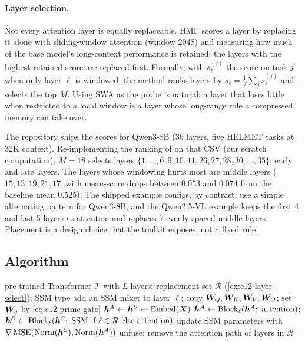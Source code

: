 \paragraph{Layer selection.} Not every attention layer is equally replaceable. HMF scores a layer by
replacing it alone with sliding-window attention (window 2048) and measuring how much of the base
model's long-context performance is retained; the layers with the highest retained score are
replaced first. Formally, with $s_\ell^{(j)}$ the score on task $j$ when only layer $\ell$ is
windowed, the method ranks layers by $\bar s_\ell = \frac1J\sum_js^{(j)}_\ell$ and selects the top
$M$. Using SWA as the probe is natural: a layer that loses little when restricted to a local window
is a layer whose long-range role a compressed memory can take over.

\begin{example}\label{ex:c12-layer-select}
The repository ships the scores for Qwen3-8B (36 layers, five HELMET tasks at 32K context). Re-implementing
the ranking of  on that CSV (our scratch computation), $M = 18$ selects
layers $\{1,\dots,6, 9, 10, 11, 26, 27, 28, 30,\dots,35\}$: early and late layers. The layers whose
windowing hurts most are middle layers ($15, 13, 19, 21, 17$, with mean-score drops between $0.053$
and $0.074$ from the baseline mean $0.525$). The shipped example configs, by contrast, use a simple
alternating pattern for Qwen3-8B, and the Qwen2.5-VL example keeps the first 4 and last 5 layers
as attention and replaces 7 evenly spaced middle layers. Placement is a design choice that the
toolkit exposes, not a fixed rule.
\end{example}

\subsection{Algorithm}

\begin{algorithm}[t]
\caption{Priming a hybrid from a pre-trained Transformer (HMF recipe).}
\label{alg:c12-priming}
\begin{algorithmic}[1]
\Require pre-trained Transformer $\mathcal{T}$ with $L$ layers; replacement set $\mathcal{R}$ (\cref{ex:c12-layer-select}); SSM type
  \State add an SSM mixer to layer $\ell$; copy $\bm{W}_Q,\bm{W}_K,\bm{W}_V,\bm{W}_O$; set $\bm{W}_g$ by \eqref{eq:c12-prime-gate}
\EndFor
{}
  \State $\bm{h}^A\gets\bm{h}^S\gets\mathrm{Embed}(\bm{X})$
    \State $\vh^A\gets\mathrm{Block}_\ell(\vh^A;\ \text{attention})$;\quad $\bm{h}^S\gets\mathrm{Block}_\ell(\bm{h}^S;\ \text{SSM if }\ell\in\mathcal{R}\text{ else attention})$
  \EndFor
  \State update SSM parameters with $\nabla\,\mathrm{MSE}(\mathrm{Norm}(\bm{h}^S),\mathrm{Norm}(\bm{h}^A))$ \Comment{\eqref{eq:c12-prime-loss}}
\EndFor
\State unfuse: remove the attention path of layers in $\mathcal{R}$
\end{algorithmic}
\end{algorithm}

